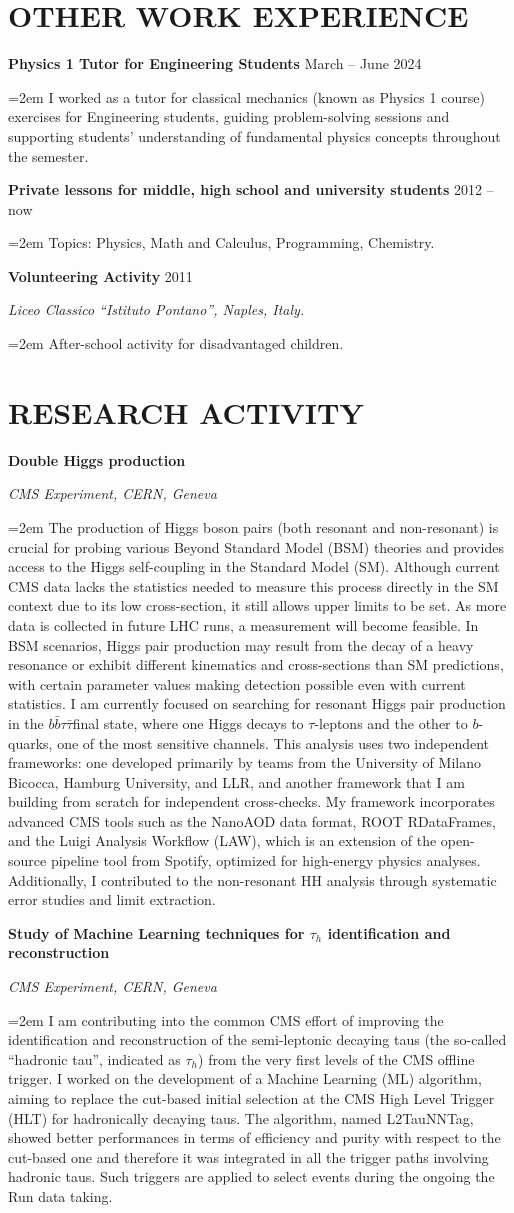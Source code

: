\documentclass[fontsize=12pt]{article} %
\newcommand{\openquote}{``}
\newcommand{\closequote}{''}
\newcommand{\bbtt}{$ b\bar{b}\tau\bar{\tau}$}
\newcommand{\sepspace}{\vspace*{1em}}		%
\newcommand{\NewPart}[1]{\section*{\uppercase{#1}}}
\newcommand{\EducationEntry}[4]{
	\noindent \textbf{#1} \hfill      %
	{#2} \par  %
	\noindent \textit{#3} \par        %
	\noindent\hangindent=2em\hangafter=0 \small #4 %
	\normalsize \par}
\begin{document}
    \NewPart{Other Work experience}
	\EducationEntry{Physics 1 Tutor for Engineering Students}{March -- June 2024}{}{
		I worked as a tutor for classical mechanics (known as Physics 1 course) exercises for Engineering students, guiding problem-solving sessions and supporting students’ understanding of fundamental physics concepts throughout the semester.  }
	\sepspace
	\EducationEntry{Private lessons for middle, high school and university students}{2012 {--} now}{}{
		Topics: Physics, Math and Calculus, Programming, Chemistry. }
	\sepspace
	\EducationEntry{Volunteering Activity}{2011}{Liceo Classico \openquote Istituto Pontano\closequote, Naples, Italy.}{After-school activity for disadvantaged children. }
	\sepspace
    \NewPart{Research activity}
    \EducationEntry{Double Higgs production}{}{CMS Experiment, CERN, Geneva}{The production of Higgs boson pairs (both resonant and non-resonant) is crucial for probing various Beyond Standard Model (BSM) theories and provides access to the Higgs self-coupling in the Standard Model (SM). Although current CMS data lacks the statistics needed to measure this process directly in the SM context due to its low cross-section, it still allows upper limits to be set. As more data is collected in future LHC runs, a measurement will become feasible. In BSM scenarios, Higgs pair production may result from the decay of a heavy resonance or exhibit different kinematics and cross-sections than SM predictions, with certain parameter values making detection possible even with current statistics.
	I am currently focused on searching for resonant Higgs pair production in the \bbtt final state, where one Higgs decays to \(\tau\)-leptons and the other to \(b\)-quarks, one of the most sensitive channels. This analysis uses two independent frameworks: one developed primarily by teams from the University of Milano Bicocca, Hamburg University, and LLR, and another framework that I am building from scratch for independent cross-checks. My framework incorporates advanced CMS tools such as the NanoAOD data format, ROOT RDataFrames, and the Luigi Analysis Workflow (LAW), which is an extension of the open-source pipeline tool from Spotify, optimized for high-energy physics analyses. Additionally, I contributed to the non-resonant HH analysis through systematic error studies and limit extraction.}
    \sepspace
    \EducationEntry{Study of Machine Learning techniques for $\tau_{h}$ identification and reconstruction}{}{CMS Experiment, CERN, Geneva}{I am contributing into the common CMS effort of improving the identification and reconstruction of the semi-leptonic decaying taus (the so-called ``hadronic tau'', indicated as $\tau_h$)  from the very first levels of the CMS offline trigger. I worked on the development of a Machine Learning (ML) algorithm, aiming to replace the cut-based initial selection at the CMS High Level Trigger (HLT) for hadronically decaying taus. The algorithm, named L2TauNNTag, showed better performances in terms of efficiency and purity with respect to the cut-based one and therefore it was integrated in all the trigger paths involving hadronic taus. Such triggers are applied to select events during the ongoing the Run\;3 data taking.}
\end{document}
